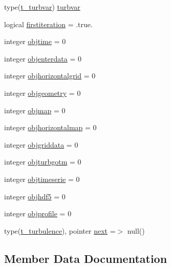 \begin{DoxyCompactItemize}
\item 
type(\mbox{\hyperlink{structmoduleturbulence_1_1t__turbvar}{t\+\_\+turbvar}}) \mbox{\hyperlink{structmoduleturbulence_1_1t__turbulence_add434cac3bec2fdefc019a2d0b436c19}{turbvar}}
\item 
logical \mbox{\hyperlink{structmoduleturbulence_1_1t__turbulence_a84d8bf3fd31026cd78a2137f73b280e2}{firstiteration}} = .true.
\item 
integer \mbox{\hyperlink{structmoduleturbulence_1_1t__turbulence_a799401663f268eb2e3943ceb0619479d}{objtime}} = 0
\item 
integer \mbox{\hyperlink{structmoduleturbulence_1_1t__turbulence_a1dc31aab77dcff0f63f7d4ff0b4645a1}{objenterdata}} = 0
\item 
integer \mbox{\hyperlink{structmoduleturbulence_1_1t__turbulence_a15021d7891561112d3089a7f64c5753d}{objhorizontalgrid}} = 0
\item 
integer \mbox{\hyperlink{structmoduleturbulence_1_1t__turbulence_a8c2fe468475dc2804eadcd4cbb7cccf0}{objgeometry}} = 0
\item 
integer \mbox{\hyperlink{structmoduleturbulence_1_1t__turbulence_acbd431a48e1af68d74e01987c5b3bc6b}{objmap}} = 0
\item 
integer \mbox{\hyperlink{structmoduleturbulence_1_1t__turbulence_a7677c7df74b1cf297ec9f888f57d91a5}{objhorizontalmap}} = 0
\item 
integer \mbox{\hyperlink{structmoduleturbulence_1_1t__turbulence_a8d123d9af3d7e3b7820892e7550533f7}{objgriddata}} = 0
\item 
integer \mbox{\hyperlink{structmoduleturbulence_1_1t__turbulence_a265fea1f07b605bf6e80d6d70ba41b22}{objturbgotm}} = 0
\item 
integer \mbox{\hyperlink{structmoduleturbulence_1_1t__turbulence_ab64bc63ff0a2d00558a37bd9e42a2da0}{objtimeserie}} = 0
\item 
integer \mbox{\hyperlink{structmoduleturbulence_1_1t__turbulence_a4ad7c081c0843063e1170e9cc09e5d95}{objhdf5}} = 0
\item 
integer \mbox{\hyperlink{structmoduleturbulence_1_1t__turbulence_a316bc99cb1738c28936570cf98b091eb}{objprofile}} = 0
\item 
type(\mbox{\hyperlink{structmoduleturbulence_1_1t__turbulence}{t\+\_\+turbulence}}), pointer \mbox{\hyperlink{structmoduleturbulence_1_1t__turbulence_a5c2e6bfd276d072540d4231efe7d84ea}{next}} =$>$ null()
\end{DoxyCompactItemize}


\subsection{Member Data Documentation}
\mbox{\label{structmoduleturbulence_1_1t__turbulence_ad00a140c77afd7993360c292cbfb7684}} 
